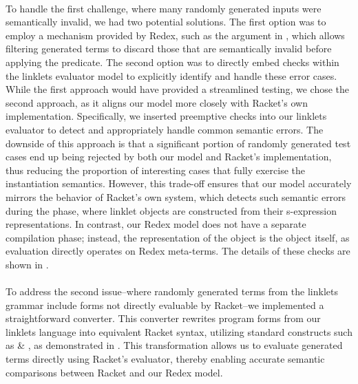 			\paragraph{}%
				To handle the first challenge, where many randomly generated inputs were semantically invalid, we had two potential solutions. The first option was to employ a mechanism provided by Redex, such as the  argument in , which allows filtering generated terms to discard those that are semantically invalid before applying the predicate. The second option was to directly embed checks within the linklets evaluator model to explicitly identify and handle these error cases. While the first approach would have provided a streamlined testing, we chose the second approach, as it aligns our model more closely with Racket's own implementation. Specifically, we inserted preemptive checks into our linklets evaluator to detect and appropriately handle common semantic errors. The downside of this approach is that a significant portion of randomly generated test cases end up being rejected by both our model and Racket's implementation, thus reducing the proportion of interesting cases that fully exercise the instantiation semantics. However, this trade-off ensures that our model accurately mirrors the behavior of Racket's own system, which detects such semantic errors during the  phase, where linklet objects are constructed from their s-expression representations. In contrast, our Redex model does not have a separate compilation phase; instead, the representation of the object is the object itself, as evaluation directly operates on Redex meta-terms. The details of these checks are shown in .


			\paragraph{}%
				To address the second issue--where randomly generated terms from the linklets grammar include forms not directly evaluable by Racket--we implemented a straightforward converter. This converter rewrites program forms from our linklets language into equivalent Racket syntax, utilizing standard constructs such as  \& , as demonstrated in . This transformation allows us to evaluate generated terms directly using Racket's evaluator, thereby enabling accurate semantic comparisons between Racket and our Redex model.

